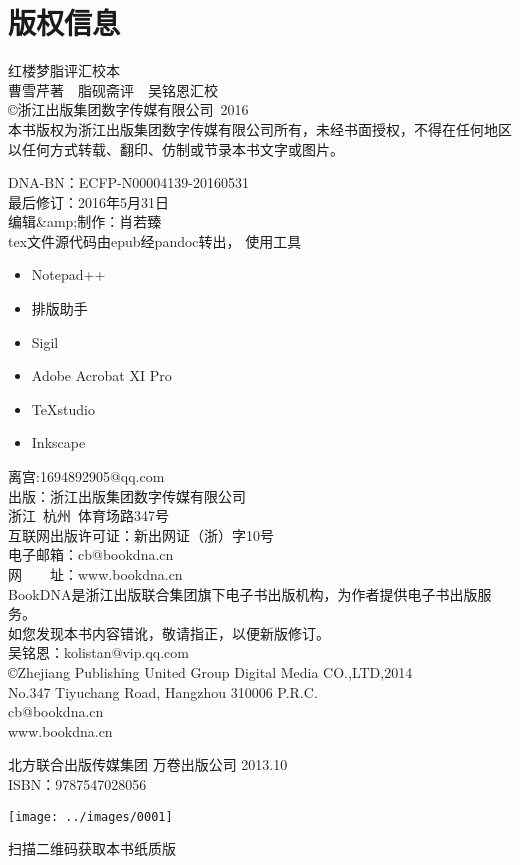 \chapter{版权信息}
\begin{flushleft}
	
{红楼梦脂评汇校本}\\
曹雪芹著~~脂砚斋评~~吴铭恩汇校\\[2\baselineskip]\copyright 浙江出版集团数字传媒有限公司~2016\\
本书版权为浙江出版集团数字传媒有限公司所有，未经书面授权，不得在任何地区以任何方式转载、翻印、仿制或节录本书文字或图片。

DNA-BN：ECFP-N00004139-20160531\\
最后修订：2016年5月31日\\
编辑\&amp;制作：{肖若臻}\\

tex文件源代码由epub经pandoc转出，
使用工具
\begin{itemize}
	\item Notepad++
	\item 排版助手
	\item Sigil
	\item Adobe Acrobat XI Pro
	\item TeXstudio
	\item Inkscape
\end{itemize}
离宫:1694892905@qq.com\\

出版：浙江出版集团数字传媒有限公司\\
浙江~杭州~体育场路347号\\
互联网出版许可证：新出网证（浙）字10号\\
电子邮箱：cb@bookdna.cn\\
网　　址：www.bookdna.cn\\
BookDNA是浙江出版联合集团旗下电子书出版机构，为作者提供电子书出版服务。\\
如您发现本书内容错讹，敬请指正，以便新版修订。\\
吴铭恩：kolistan@vip.qq.com\\

\copyright Zhejiang Publishing United Group Digital Media CO.,LTD,2014\\
No.347 Tiyuchang Road, Hangzhou 310006 P.R.C.\\
cb@bookdna.cn\\
www.bookdna.cn



北方联合出版传媒集团 万卷出版公司 2013.10\\
ISBN：9787547028056
\end{flushleft}
\begin{center}
	\texttt{[image: ../images/0001]}
	\begin{center}
		{\LARGE 扫描二维码获取本书纸质版}
	\end{center}
\end{center}
